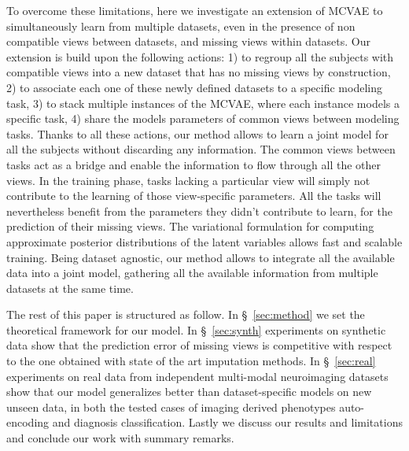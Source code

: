 To overcome these limitations, here we investigate an extension of MCVAE to simultaneously learn from multiple datasets, even in the presence of non compatible views between datasets, and missing views within datasets.
Our extension  is build upon the following actions:
1) to regroup all the subjects with compatible views into a new dataset that has no missing views by construction,
2) to associate each one of these newly defined datasets to a specific modeling task,
3) to stack multiple instances of the MCVAE, where each instance models a specific task,
4) share the models parameters of common views between modeling tasks.
%
Thanks to all these actions, our method allows to learn a joint model for all the subjects without discarding any information.
The common views between tasks act as a bridge and enable the information to flow through all the other views.
In the training phase, tasks lacking a particular view will simply not contribute to the learning of those view-specific parameters.
All the tasks will nevertheless benefit from the parameters they didn't contribute to learn, for the prediction of their missing views.
The variational formulation for computing approximate posterior distributions of the latent variables allows fast and scalable training.
Being dataset agnostic, our method allows to integrate all the available data into a joint model, gathering  all the available information from multiple datasets at the same time.

The rest of this paper is structured as follow.
In \S~\ref{sec:method} we set the theoretical framework for our model.
In \S~\ref{sec:synth} experiments on synthetic data show that the prediction error of missing views is competitive with respect to the one obtained with state of the art imputation methods.
In \S~\ref{sec:real} experiments on real data from independent multi-modal neuroimaging datasets show that our model generalizes better than dataset-specific models on new unseen data, in both the tested cases of imaging derived phenotypes auto-encoding and diagnosis classification.
Lastly we discuss our results and limitations and conclude our work with summary remarks.
